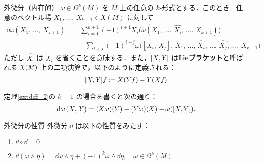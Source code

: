 \documentclass[geometry_main]{subfiles}
\begin{document}
\begin{mytheo}[label=extdiff_2]{外微分（内在的）}
	$\omega \in \Omega^k(M)$ を $M$ 上の任意の $k$-形式とする．このとき，任意のベクトル場 $X_1,\, \dots ,\, X_{k+1} \in \mathfrak{X} (M)$ に対して
	\begin{align} 
		\dd{\omega} (X_1,\, \dots ,\, X_{k+1}) = &\sum_{i=1}^{k+1} (-1)^{i+1} X_i \bigl( \omega(X_1,\, \dots ,\, \hat{X_i},\, \dots,\, X_{k+1}) \bigr) \\
		&+ \sum_{i < j} (-1)^{i+j} \omega \bigl( [X_i,\, X_j],\, X_1,\, \dots ,\, \hat{X_i},\, \dots ,\, \hat{X_j},\, \dots ,\, X_{k+1} \bigr) 
	\end{align}
	ただし $\hat{X_i}$ は $X_i$ を省くことを意味する．また，$\comm{X}{Y}$ は\textbf{Lieブラケット}と呼ばれる $\mathfrak{X}(M)$ 上の二項演算で，以下のように定義される：
	\begin{align} 
		\comm{X}{Y}f \coloneqq X(Yf) - Y(Xf)
	\end{align}
\end{mytheo}

定理\ref{extdiff_2}の $k=1$ の場合を書くと次の通り：
\begin{align} 
	\dd{\omega}(X,\, Y) = (X\omega)(Y) - (Y\omega)(X) - \omega(\comm{X}{Y}).
\end{align}

\begin{mytheo}[label=extdiff_3]{外微分の性質}
	外微分 $\dd{}$ は以下の性質をみたす：
	\begin{enumerate} 
		\item $\dd{}\circ \dd{} = 0$
		\item $\dd{(\omega \wedge \eta)} = \dd{\omega} \wedge \eta + (-1)^k \omega \wedge \dd{\eta},\quad \omega \in \Omega^k(M)$
	\end{enumerate}
\end{mytheo}
\end{document}
